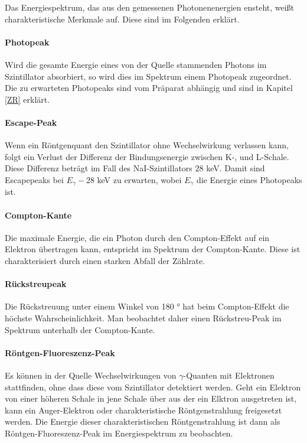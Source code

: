 \documentclass[12pt,listof=totoc]{scrartcl}
\begin{document}
Das Energiespektrum, das aus den gemessenen Photonenenergien ensteht, weißt  charakteristische Merkmale auf. Diese sind im Folgenden erklärt. 
 
 
 \paragraph{Photopeak}
 
 Wird die gesamte Energie eines von der Quelle stammenden Photons im Szintillator absorbiert, so wird dies im Spektrum einem Photopeak zugeordnet. Die zu erwarteten Photopeaks sind vom Präparat abhängig und sind in Kapitel \ref{ZR} erklärt.
 \paragraph{Escape-Peak}
 Wenn ein Röntgenquant den Szintillator ohne Wechselwirkung verlassen kann, folgt ein Verlust der Differenz der Bindungsenergie zwischen K-, und L-Schale. Diese Differenz beträgt im Fall des NaI-Szintillators $28$ keV. Damit sind Escapepeaks bei $E_\gamma - 28$ keV zu erwarten, wobei $E_\gamma$ die Energie eines Photopeaks ist.

 \paragraph{Compton-Kante}
 Die maximale Energie, die ein Photon durch den Compton-Effekt auf ein Elektron übertragen kann, entspricht im Spektrum der Compton-Kante. Diese ist charakterisiert durch einen starken Abfall der Zählrate.
 
 \paragraph{Rückstreupeak}
 
 Die Rückstreuung unter einem Winkel von 180 ° hat beim Compton-Effekt die höchste Wahrscheinlichkeit.
 Man beobachtet daher einen Rückstreu-Peak im Spektrum unterhalb der Compton-Kante.

 
 \paragraph{Röntgen-Fluoreszenz-Peak}
Es können in der Quelle Wechselwirkungen von $\gamma$-Quanten mit Elektronen stattfinden, ohne dass diese vom Szintillator detektiert werden. Geht ein Elektron von einer höheren Schale in jene Schale über aus der ein Elktron ausgetreten ist, kann ein Auger-Elektron oder charakteristische Röntgenstrahlung freigesetzt werden. Die Energie dieser charakteristischen Röntgenstrahlung ist dann als Röntgen-Fluoreszenz-Peak im Energiespektrum zu beobachten.
\end{document}
